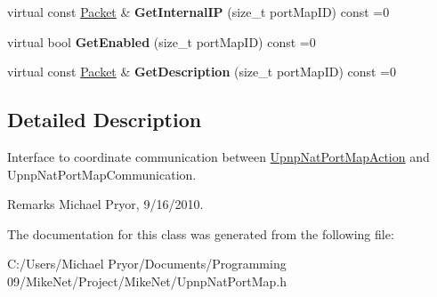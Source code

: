 \begin{DoxyCompactItemize}
\item 
\hypertarget{class_upnp_nat_port_map_a35286ed11b418bd733a1175038cd38ea}{
virtual const \hyperlink{class_packet}{Packet} \& {\bfseries GetInternalIP} (size\_\-t portMapID) const =0}
\label{class_upnp_nat_port_map_a35286ed11b418bd733a1175038cd38ea}

\item 
\hypertarget{class_upnp_nat_port_map_a9cfd5c5b884ffa8ff169218a4784e180}{
virtual bool {\bfseries GetEnabled} (size\_\-t portMapID) const =0}
\label{class_upnp_nat_port_map_a9cfd5c5b884ffa8ff169218a4784e180}

\item 
\hypertarget{class_upnp_nat_port_map_a1cacc4e662745533a0b7046d412d3d8a}{
virtual const \hyperlink{class_packet}{Packet} \& {\bfseries GetDescription} (size\_\-t portMapID) const =0}
\label{class_upnp_nat_port_map_a1cacc4e662745533a0b7046d412d3d8a}

\end{DoxyCompactItemize}


\subsection{Detailed Description}
Interface to coordinate communication between \hyperlink{class_upnp_nat_port_map_action}{UpnpNatPortMapAction} and UpnpNatPortMapCommunication. \begin{DoxyRemark}{Remarks}
Michael Pryor, 9/16/2010. 
\end{DoxyRemark}


The documentation for this class was generated from the following file:\begin{DoxyCompactItemize}
\item 
C:/Users/Michael Pryor/Documents/Programming 09/MikeNet/Project/MikeNet/UpnpNatPortMap.h\end{DoxyCompactItemize}
